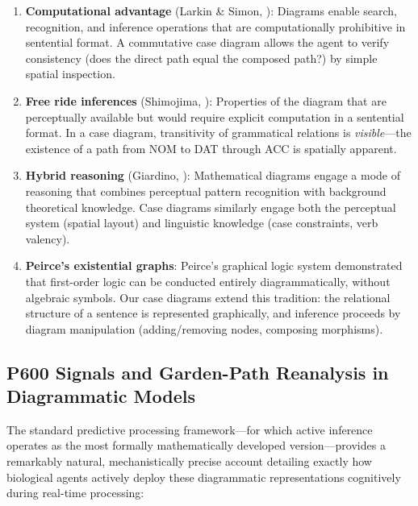 \documentclass[
]{article}
\begin{document}
\begin{enumerate}
\def\labelenumi{\arabic{enumi}.}
\item
  \textbf{Computational advantage} (Larkin \& Simon,
  \citeyearpar{larkin1987diagram}): Diagrams enable search, recognition,
  and inference operations that are computationally prohibitive in
  sentential format. A commutative case diagram allows the agent to
  verify consistency (does the direct path equal the composed path?) by
  simple spatial inspection.
\item
  \textbf{Free ride inferences} (Shimojima,
  \citeyearpar{shimojima1996reasoning}): Properties of the diagram that
  are perceptually available but would require explicit computation in a
  sentential format. In a case diagram, transitivity of grammatical
  relations is \emph{visible}---the existence of a path from NOM to DAT
  through ACC is spatially apparent.
\item
  \textbf{Hybrid reasoning} (Giardino,
  \citeyearpar{giardino2017diagrammatic}): Mathematical diagrams engage
  a mode of reasoning that combines perceptual pattern recognition with
  background theoretical knowledge. Case diagrams similarly engage both
  the perceptual system (spatial layout) and linguistic knowledge (case
  constraints, verb valency).
\item
  \textbf{Peirce's existential graphs}: Peirce's graphical logic system
  demonstrated that first-order logic can be conducted entirely
  diagrammatically, without algebraic symbols. Our case diagrams extend
  this tradition: the relational structure of a sentence is represented
  graphically, and inference proceeds by diagram manipulation
  (adding/removing nodes, composing morphisms).
\end{enumerate}

\subsection{P600 Signals and Garden-Path Reanalysis in Diagrammatic
Models}\label{p600-signals-and-garden-path-reanalysis-in-diagrammatic-models}

The standard predictive processing framework---for which active
inference operates as the most formally mathematically developed
version---provides a remarkably natural, mechanistically precise account
detailing exactly how biological agents actively deploy these
diagrammatic representations cognitively during real-time processing:
\end{document}
